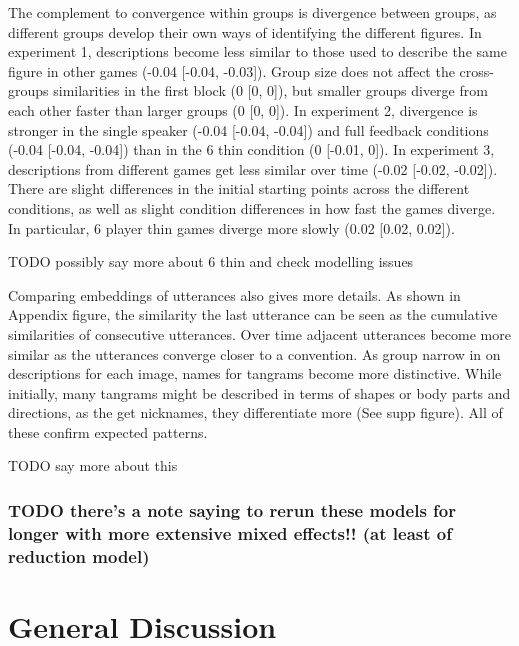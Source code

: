 \documentclass[
  english,
  a4paper,
]{article}
\begin{document}
The complement to convergence within groups is divergence between groups, as different groups develop their own ways of identifying the different figures. In experiment 1, descriptions become less similar to those used to describe the same figure in other games (-0.04 {[}-0.04, -0.03{]}). Group size does not affect the cross-groups similarities in the first block (0 {[}0, 0{]}), but smaller groups diverge from each other faster than larger groups (0 {[}0, 0{]}). In experiment 2, divergence is stronger in the single speaker (-0.04 {[}-0.04, -0.04{]}) and full feedback conditions (-0.04 {[}-0.04, -0.04{]}) than in the 6 thin condition (0 {[}-0.01, 0{]}). In experiment 3, descriptions from different games get less similar over time (-0.02 {[}-0.02, -0.02{]}). There are slight differences in the initial starting points across the different conditions, as well as slight condition differences in how fast the games diverge. In particular, 6 player thin games diverge more slowly (0.02 {[}0.02, 0.02{]}).

TODO possibly say more about 6 thin and check modelling issues

Comparing embeddings of utterances also gives more details. As shown in Appendix figure, the similarity the last utterance can be seen as the cumulative similarities of consecutive utterances. Over time adjacent utterances become more similar as the utterances converge closer to a convention. As group narrow in on descriptions for each image, names for tangrams become more distinctive. While initially, many tangrams might be described in terms of shapes or body parts and directions, as the get nicknames, they differentiate more (See supp figure). All of these confirm expected patterns.

TODO say more about this

\hypertarget{todo-theres-a-note-saying-to-rerun-these-models-for-longer-with-more-extensive-mixed-effects-at-least-of-reduction-model}{%
\subsubsection{TODO there's a note saying to rerun these models for longer with more extensive mixed effects!! (at least of reduction model)}\label{todo-theres-a-note-saying-to-rerun-these-models-for-longer-with-more-extensive-mixed-effects-at-least-of-reduction-model}}

\hypertarget{general-discussion}{%
\section{General Discussion}\label{general-discussion}}
\end{document}
